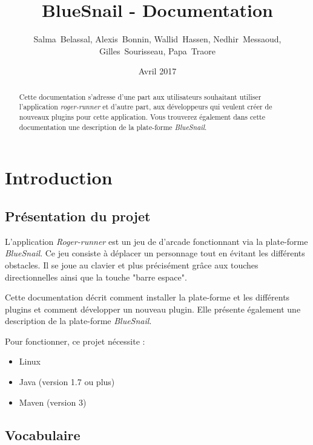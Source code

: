 \documentclass[11pt]{article}
\title{BlueSnail - Documentation}
\author{Salma~Belassal, Alexis~Bonnin, Wallid~Hassen, Nedhir~Messaoud, \\ Gilles~Sourisseau, Papa~Traore}
\date{Avril 2017}
\begin{document}
\maketitle

\newpage
\begin{abstract}
    Cette documentation s'adresse d'une part aux utilisateurs souhaitant utiliser l'application \textit{roger-runner} et d'autre part, aux développeurs qui veulent créer de nouveaux plugins pour cette application. Vous trouverez également dans cette documentation une description de la plate-forme \textit{BlueSnail}.
\end{abstract}

\newpage
\tableofcontents

\newpage

\section{Introduction}

\subsection{Présentation du projet}
    L'application \textit{Roger-runner} est un jeu de d'arcade fonctionnant via la plate-forme \textit{BlueSnail}. Ce jeu consiste à déplacer un personnage tout en évitant les différents obstacles. Il se joue au clavier et plus précisément grâce aux touches directionnelles ainsi que la touche "barre espace".
    
    Cette documentation décrit comment installer la plate-forme et les différents plugins et comment développer un nouveau plugin. Elle présente également une description de la plate-forme \textit{BlueSnail}.
    
    Pour fonctionner, ce projet nécessite :
    \begin{itemize}
        \item Linux
        \item Java (version 1.7 ou plus)
        \item Maven (version 3)
    \end{itemize}
    
\subsection{Vocabulaire}
\label{subsec:vocabulaire}
\end{document}
